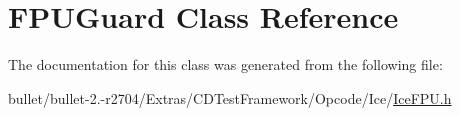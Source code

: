 \hypertarget{class_f_p_u_guard}{\section{F\+P\+U\+Guard Class Reference}
\label{class_f_p_u_guard}
}


The documentation for this class was generated from the following file\+:\begin{DoxyCompactItemize}
\item 
bullet/bullet-\/2.-\/r2704/\+Extras/\+C\+D\+Test\+Framework/\+Opcode/\+Ice/\hyperlink{_ice_f_p_u_8h}{Ice\+F\+P\+U.\+h}\end{DoxyCompactItemize}
